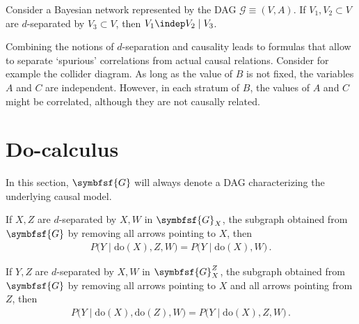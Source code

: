     \begin{property}
        Consider a Bayesian network represented by the DAG $\mathcal{G}\equiv(V,A)$. If $V_1,V_2\subset V$ are $d$-separated by $V_3\subset V$, then $V_1\indep V_2\mid V_3$.
    \end{property}


    Combining the notions of $d$-separation and causality leads to formulas that allow to separate `spurious' correlations from actual causal relations. Consider for example the collider diagram. As long as the value of $B$ is not fixed, the variables $A$ and $C$ are independent. However, in each stratum of $B$, the values of $A$ and $C$ might be correlated, although they are not causally related.

\section{Do-calculus}

    In this section, $\symbfsf{G}$ will always denote a DAG characterizing the underlying causal model.

    \begin{axiom}
        If $X,Z$ are $d$-separated by $X,W$ in $\symbfsf{G}_X$, the subgraph obtained from $\symbfsf{G}$ by removing all arrows pointing to $X$, then
        \begin{gather}
            P\bigl(Y\mid\mathrm{do}(X),Z,W\bigr) = P\bigl(Y\mid\mathrm{do}(X),W\bigr)\,.
        \end{gather}
    \end{axiom}

    \begin{axiom}
        If $Y,Z$ are $d$-separated by $X,W$ in $\symbfsf{G}_X^Z$, the subgraph obtained from $\symbfsf{G}$ by removing all arrows pointing to $X$ and all arrows pointing from $Z$, then
        \begin{gather}
            P\bigl(Y\mid\mathrm{do}(X),\mathrm{do}(Z),W\bigr) = P\bigl(Y\mid\mathrm{do}(X),Z,W\bigr)\,.
        \end{gather}
    \end{axiom}


